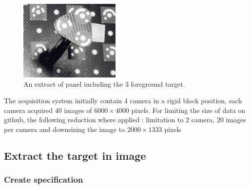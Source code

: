 \begin{figure}
\centering
	\includegraphics[width=5cm]{Tutorial/Images/Perche.jpg}
	\caption{An extract of panel including the $3$ foreground target.}
\label{fig:CodeT:Panel}
\end{figure}


The acquisition system initially contain $4$ camera in a rigid block position, each camera acquired
$40$ images of $6000 \times  4000$ pixels. For limiting the size of data on github, the following reduction
where applied : limitation to $2$ camera, $20$ images per camera and downsizing the image to $2000 \times  1333$ pixels



\subsection{Extract the target in image}


\subsubsection{Create specification}


